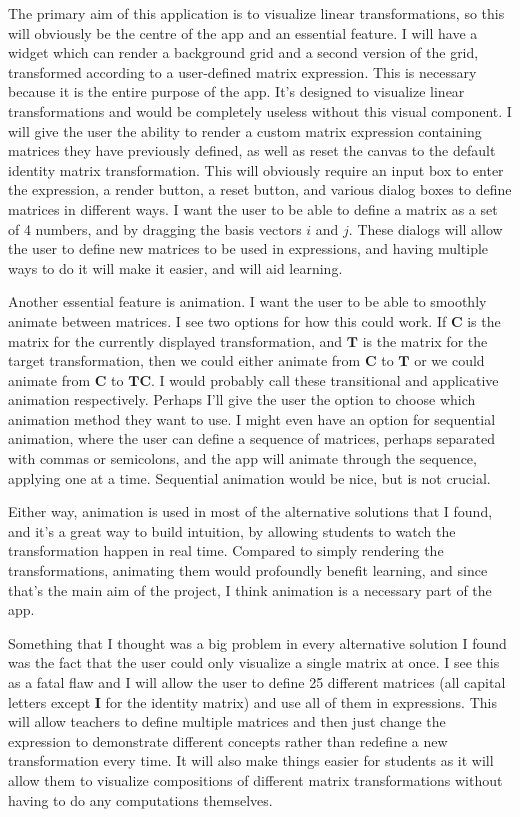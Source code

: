 \documentclass[../main.tex]{subfiles}
\begin{document}
The primary aim of this application is to visualize linear transformations, so this will obviously be the centre of the app and an essential feature. I will have a widget which can render a background grid and a second version of the grid, transformed according to a user-defined matrix expression. This is necessary because it is the entire purpose of the app. It's designed to visualize linear transformations and would be completely useless without this visual component. I will give the user the ability to render a custom matrix expression containing matrices they have previously defined, as well as reset the canvas to the default identity matrix transformation. This will obviously require an input box to enter the expression, a render button, a reset button, and various dialog boxes to define matrices in different ways. I want the user to be able to define a matrix as a set of 4 numbers, and by dragging the basis vectors $i$ and $j$. These dialogs will allow the user to define new matrices to be used in expressions, and having multiple ways to do it will make it easier, and will aid learning.

Another essential feature is animation. I want the user to be able to smoothly animate between matrices. I see two options for how this could work. If $\mathbf{C}$ is the matrix for the currently displayed transformation, and $\mathbf{T}$ is the matrix for the target transformation, then we could either animate from $\mathbf{C}$ to $\mathbf{T}$ or we could animate from $\mathbf{C}$ to $\mathbf{TC}$. I would probably call these transitional and applicative animation respectively. Perhaps I'll give the user the option to choose which animation method they want to use. I might even have an option for sequential animation, where the user can define a sequence of matrices, perhaps separated with commas or semicolons, and the app will animate through the sequence, applying one at a time. Sequential animation would be nice, but is not crucial.

Either way, animation is used in most of the alternative solutions that I found, and it's a great way to build intuition, by allowing students to watch the transformation happen in real time. Compared to simply rendering the transformations, animating them would profoundly benefit learning, and since that's the main aim of the project, I think animation is a necessary part of the app.

Something that I thought was a big problem in every alternative solution I found was the fact that the user could only visualize a single matrix at once. I see this as a fatal flaw and I will allow the user to define 25 different matrices (all capital letters except $\mathbf{I}$ for the identity matrix) and use all of them in expressions. This will allow teachers to define multiple matrices and then just change the expression to demonstrate different concepts rather than redefine a new transformation every time. It will also make things easier for students as it will allow them to visualize compositions of different matrix transformations without having to do any computations themselves.
\end{document}
